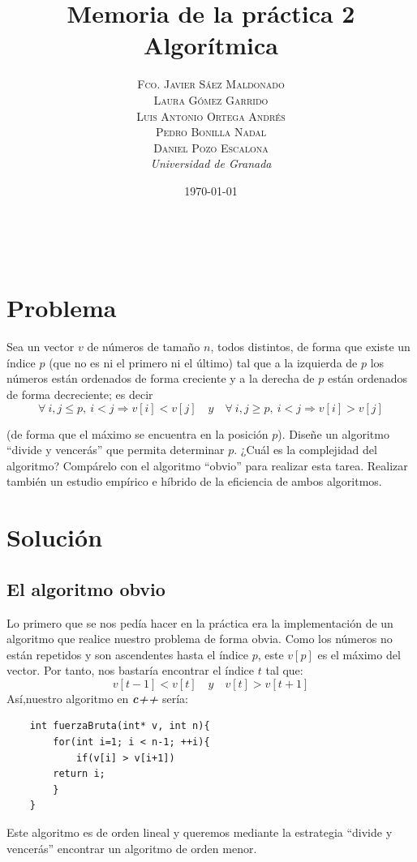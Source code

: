 \documentclass[a4paper, 11pt]{article}
\title{\textbf{Memoria de la práctica 2}\\ %
Algorítmica} %
\author{\textsc{Fco. Javier Sáez Maldonado}\\ %
\textsc{Laura Gómez Garrido}\\
\textsc{Luis Antonio Ortega Andrés}\\
\textsc{Pedro Bonilla Nadal}\\
\textsc{Daniel Pozo Escalona}\vspace{2cm}
\\{\textit{Universidad de Granada}}} %
\date{\today} %
\makeatletter
\renewcommand{\maketitle}{
  \begin{flushright} %
  
  {\LARGE\@title} %
  
  \vspace{50pt} %
  
  {\large\@author} %
  \\\@date %
  \vspace{40pt} %
  \end{flushright}
}
\makeatother
\begin{document}
\maketitle %


{\parskip=2pt
  \tableofcontents
}
\pagebreak



\section{Problema}

Sea un vector $v$ de números de tamaño $n$, todos distintos, de forma que existe un índice $p$ (que no es ni el primero ni el último) tal que a la izquierda de $p$ los números están ordenados de forma creciente y a la derecha de $p$ están ordenados de forma decreciente; es decir
\[
\forall \ i,j \leq p , \ i < j \Rightarrow v[i] < v[j] \quad y \quad \forall \ i,j \geq p, \ i < j \Rightarrow v[i]>v[j]
\]

(de forma que el máximo se encuentra en la posición $p$). Diseñe un algoritmo ``divide y vencerás'' que permita determinar $p$. ¿Cuál es la complejidad del algoritmo? Compárelo con el algoritmo ``obvio'' para realizar esta tarea. Realizar también un estudio empírico e híbrido de la eficiencia de ambos algoritmos.

\section{Solución}

\subsection{El algoritmo obvio}
Lo primero que se nos pedía hacer en la práctica era la implementación de un algoritmo que realice nuestro problema de forma obvia. Como los números no están repetidos y son ascendentes hasta el índice $p$, este $v[p]$ es el máximo del vector. Por tanto, nos bastaría encontrar el índice $t$ tal que:
\[
v[t-1] < v[t] \quad y \quad v[t] > v[t+1]
\]
Así,nuestro algoritmo en\textbf{ \emph{c++} } sería:
\begin{lstlisting}
	int fuerzaBruta(int* v, int n){
		for(int i=1; i < n-1; ++i){
     		if(v[i] > v[i+1])
       	return i;
		}
	}
\end{lstlisting}

Este algoritmo es de orden lineal y queremos mediante la estrategia ``divide y vencerás'' encontrar un algoritmo de orden menor.
\end{document}
